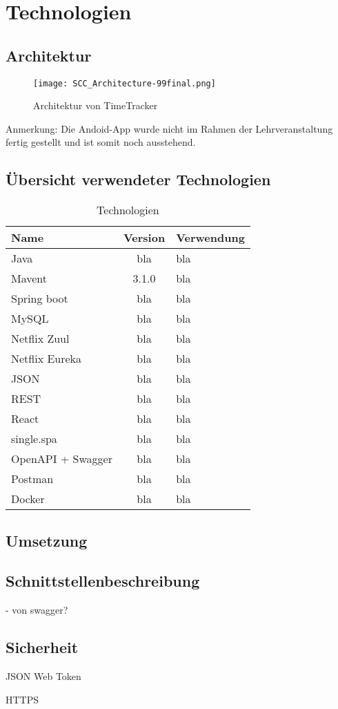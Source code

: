 

\section{Technologien}


\subsection{Architektur}


\begin{figure}[H]
	\hspace{-1.5cm}
	\texttt{[image: SCC\_Architecture-99final.png]}
	\caption{Architektur von TimeTracker}
	\label{fig:Architektur}
\end{figure}

Anmerkung: Die Andoid-App wurde nicht im Rahmen der Lehrveranstaltung fertig gestellt und ist somit noch ausstehend. 

\subsection{Übersicht verwendeter Technologien}
\begin{table}[H] 
	\centering
	\caption{Technologien}
	\begin{tabularx}{\textwidth}{l|c|X}
		\textbf{Name} & \textbf{Version} & \textbf{Verwendung} \\
		\hline
		Java & bla & bla \\
		Mavent & 3.1.0 & bla \\
		Spring boot & bla & bla \\
		MySQL & bla & bla \\
		Netflix Zuul & bla & bla \\
		Netflix Eureka & bla & bla \\
		JSON & bla & bla \\
		REST & bla & bla \\
		React & bla & bla \\
		single.spa & bla & bla \\
		OpenAPI + Swagger & bla & bla \\
		Postman & bla & bla \\
		Docker & bla & bla \\
	\end{tabularx}
	\label{tab:Technologien}
\end{table}

\subsection{Umsetzung}

\subsection{Schnittstellenbeschreibung}
- von swagger? 


\subsection{Sicherheit}
JSON Web Token   

HTTPS

